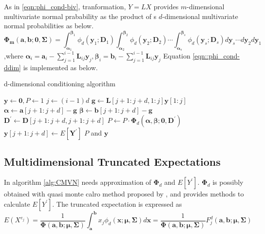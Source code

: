 As in \eqref{eqn:phi_cond-biv}, tranformation, $Y=LX$ provides $m$-dimensional multivariate normal prabability as the product of s $d$-dimensional multivariate normal probabilities as below.
\begin{equation}\label{eqn::phi_cond-ddim}
	\boldsymbol{\Phi_m}(\mathbf{a},\mathbf{b};\mathbf{0},\boldsymbol{\Sigma})=\int_{\mathbf{\alpha}_1}^{\mathbf{\beta}_1}\phi_d(\mathbf{y}_1;\mathbf{D}_1)\int_{\mathbf{\alpha}_2}^{\mathbf{\beta}_2}\phi_d(\mathbf{y}_2;\mathbf{D}_2)\cdots\int_{\mathbf{\alpha}_s}^{\mathbf{\beta}_s}\phi_d(\mathbf{y}_s;\mathbf{D}_s)d\mathbf{y}_s\cdots d\mathbf{y}_2d\mathbf{y}_1
\end{equation}
,where $\boldsymbol{\alpha}_i=\mathbf{a}_i-\sum_{j=1}^{i-1}\mathbf{L}_{ij}\mathbf{y}_j, \boldsymbol{\beta}_i=\mathbf{b}_i-\sum_{j=1}^{i-1}\mathbf{L}_{ij}\mathbf{y}_j$
Equation \eqref{eqn::phi_cond-ddim} is implemented as below.

\begin{algorithm}[H]
	\caption{d-dimensional conditioning algorithm}
	\begin{algorithmic}[1]
		\State $\mathbf{y}\leftarrow\mathbf{0},P\leftarrow1$
		\State $j\leftarrow(i-1)d$
		\State $\mathbf{g}\leftarrow\mathbf{L}[j+1:j+d,1:j]\mathbf{y}[1:j]$
		\State $\boldsymbol{\alpha}\leftarrow\mathbf{a}[j+1:j+d]-\mathbf{g}$
		\State $\boldsymbol{\beta}\leftarrow\mathbf{b}[j+1:j+d]-\mathbf{g}$
		\State $\mathbf{D}^\prime\leftarrow\mathbf{D}[j+1:j+d,j+1:j+d]$
		\State $P\leftarrow P\cdot\boldsymbol{\Phi}_d(\boldsymbol{\alpha},\boldsymbol{\beta};\mathbf{0},\mathbf{D}^\prime)$
		\State $\mathbf{y}[j+1:j+d]\leftarrow E[\mathbf{Y}^\prime]$
		\EndFor
		\State\Return $P$ and $\mathbf{y}$
		\EndProcedure
	\end{algorithmic}\label{alg:CMVN}
\end{algorithm}

\subsection{Multidimensional Truncated Expectations}
In algorithm \ref{alg:CMVN} needs approximation of $\boldsymbol{\Phi}_d$ and $E[Y^\prime]$. $\boldsymbol{\Phi}_d$ is possibly obtained with quasi monte calro method proposed by \citet{genz2009computation}, and \citet{kan2017moments} provides methods to calculate $E[Y^\prime]$. The truncated expectation is expressed as
$$E(X^{e_j})=\frac{1}{\boldsymbol{\Phi}(\mathbf{a},\mathbf{b};\boldsymbol{\mu},\boldsymbol{\Sigma})}\int_\mathbf{a}^\mathbf{b}x_j\phi_d(\mathbf{x};\boldsymbol{\mu},\boldsymbol{\Sigma})d\mathbf{x}=\frac{1}{\boldsymbol{\Phi}(\mathbf{a},\mathbf{b};\boldsymbol{\mu},\boldsymbol{\Sigma})}F_j^d(\mathbf{a},\mathbf{b};\boldsymbol{\mu},\boldsymbol{\Sigma})$$

